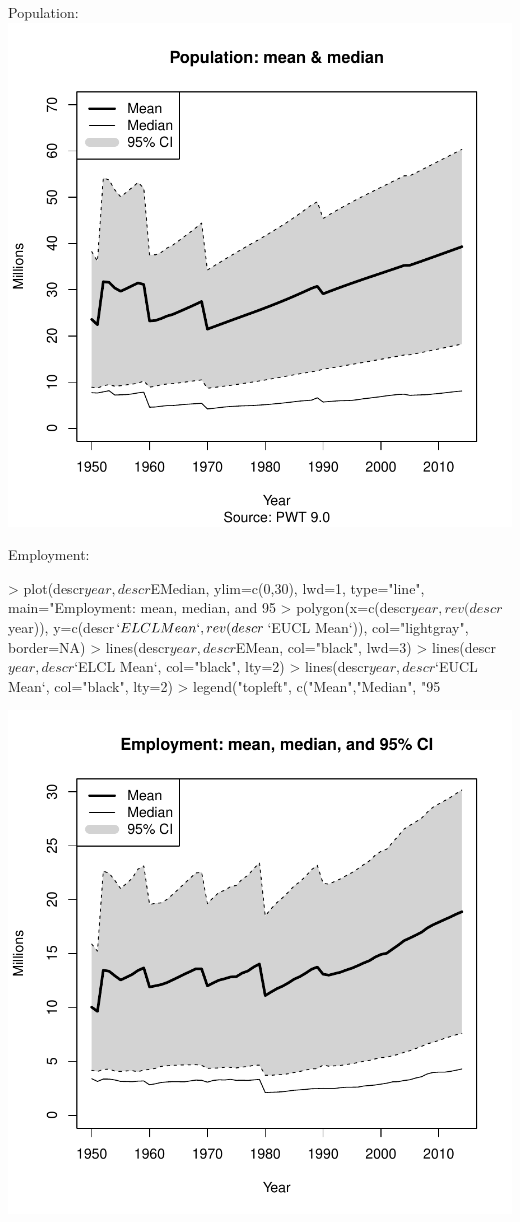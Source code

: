 \documentclass[pt=12]{article}
\begin{document}
Population:
\includegraphics{test-003}

Employment:
\begin{Schunk}
\begin{Sinput}
> plot(descr$year, descr$EMedian, ylim=c(0,30), lwd=1, type="line", main="Employment: mean, median, and 95%
> polygon(x=c(descr$year, rev(descr$year)), y=c(descr$`ELCL Mean`, rev(descr$`EUCL Mean`)), col="lightgray", border=NA)
> lines(descr$year, descr$EMean, col="black", lwd=3)
> lines(descr$year, descr$`ELCL Mean`, col="black", lty=2)
> lines(descr$year, descr$`EUCL Mean`, col="black", lty=2)
> legend("topleft", c("Mean","Median", "95%
\end{Sinput}
\end{Schunk}
\includegraphics{test-004}
\end{document}
